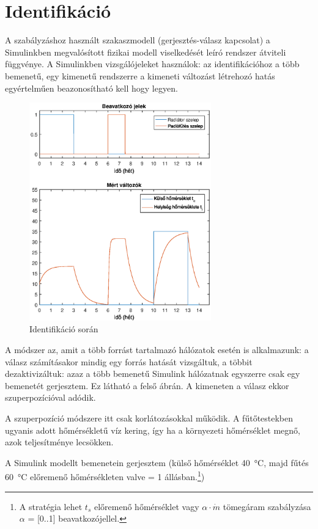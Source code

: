 \chapter{Identifikáció}\label{chap:ident}


A szabályzáshoz használt szakaszmodell (gerjesztés-válasz kapcsolat) a Simulinkben megvalósított fizikai modell viselkedését leíró rendszer átviteli függvénye. A Simulinkben vizsgálójeleket használok: az identifikációhoz a több bemenetű, egy kimenetű rendszerre a kimeneti változást létrehozó hatás egyértelműen beazonosítható kell hogy legyen.

\begin{figure}[H]
	\centering
	\includegraphics[trim=0 0 0 0, clip,width=0.7\textwidth]{figures/ident-valve2}
	\caption{Identifikáció során }
	\label{fig:ident}
\end{figure}

A módszer az, amit a több forrást tartalmazó hálózatok esetén is alkalmazunk: a válasz számításakor mindig egy forrás hatását vizsgáltuk, a többit dezaktivizáltuk: azaz a több bemenetű Simulink hálózatnak egyszerre csak egy bemenetét gerjesztem. Ez látható a felső ábrán. A kimeneten a válasz ekkor szuperpozícióval adódik. 

A szuperpozíció módszere itt csak korlátozásokkal működik. A fűtőtestekben ugyanis adott hőmérsékletű víz kering, így ha a környezeti hőmérséklet megnő, azok teljesítménye lecsökken. 

A Simulink modellt bemenetein gerjesztem (külső hőmérséklet \SI{40}{\celsius}, majd fűtés \SI{60}{\celsius} előremenő hőmérsékleten valve = 1 állásban.\footnote{A stratégia lehet $t_s$ előremenő hőmérséklet vagy $\alpha \cdot \dot m$ tömegáram szabályzása $\alpha$ = [0..1] beavatkozójellel. })



